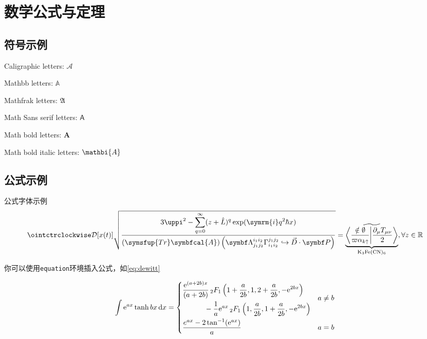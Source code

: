 \chapter{数学公式与定理}

\section{符号示例}

Caligraphic letters: $\mathcal{A}$ 

Mathbb letters: $\mathbb{A}$

Mathfrak letters: $\mathfrak{A}$

Math Sans serif letters: $\mathsf{A}$

Math bold letters: $\mathbf{A}$

Math bold italic letters: $\mathbi{A}$

\section{公式示例}

公式字体示例
\[
    \displaystyle \ointctrclockwise\mathcal{D}[x(t)]\sqrt{\frac{\displaystyle3\uppi^2-\sum_{q=0}^{\infty}(z+\hat L)^{q}\exp(\symrm{i}q^2 \hbar x)}{\displaystyle (\symsfup{Tr}\symbfcal{A})\left(\symbf\Lambda_{j_1j_2}^{i_1i_2}\Gamma_{i_1i_2}^{j_1j_2}\hookrightarrow\vec D\cdot \symbf P  \right)}}
    =\underbrace{\widetilde{\left\langle \frac{\notin \emptyset}{\varpi\alpha_{k\uparrow}}\middle\vert \frac{\partial_\mu T_{\mu\nu}}{2}\right\rangle}}_{\mathrm{K}_3\mathrm{Fe}(\mathrm{CN})_6} ,\forall z \in \mathbb{R}
\]

你可以使用\verb|equation|环境插入公式，如\cref{eq:dewitt}

\begin{equation}\label{eq:dewitt}
    \int \mathrm{e}^{ax} \tanh {bx} \, \mathrm{d}x =
    \begin{dcases}
        \begin{multlined}
            \frac{\mathrm{e}^{(a+2b)x}}{(a + 2b)} \,
            {{}_2F_1} \left( 1 + \frac{a}{2b}, 1, 2+\frac{a}{2b}, -\mathrm{e}^{2bx} \right) \\
            - \frac{1}{a} \mathrm{e}^{ax} \, {{}_2F_1} \left( 1, \frac{a}{2b}, 1 + \frac{a}{2b}, -\mathrm{e}^{2bx} \right)
        \end{multlined}
        & a \ne b \\
    \frac{e^{ax} - 2 \tan^{-1}(\mathrm{e}^{ax})}{a} & a = b
  \end{dcases}
\end{equation}

